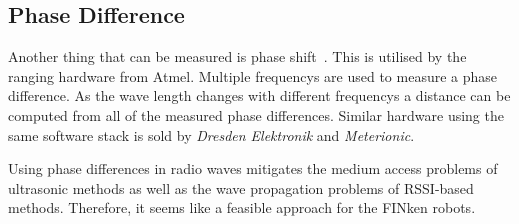 \subsection{Phase Difference}

Another thing that can be measured is phase shift~\cite{2_kluge_eggert_2009}.
This is utilised by the ranging hardware from Atmel.
Multiple frequencys are used to measure a phase difference.
As the wave length changes with different frequencys a distance can be computed from all of the measured phase differences.
Similar hardware using the same software stack is sold by \emph{Dresden Elektronik} and \emph{Meterionic}.

Using phase differences in radio waves mitigates the medium access problems of ultrasonic methods as well as the wave propagation problems of RSSI-based methods.
Therefore, it seems like a feasible approach for the FINken robots.

